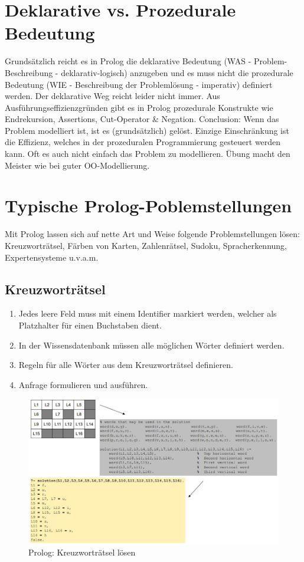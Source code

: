 \section{Deklarative vs. Prozedurale Bedeutung}
Grundsätzlich reicht es in Prolog die deklarative Bedeutung (WAS - Problem-Beschreibung - deklarativ-logisch) anzugeben und es muss nicht die prozedurale Bedeutung (WIE - Beschreibung der Problemlösung - imperativ) definiert werden. Der deklarative Weg reicht leider nicht immer. Aus Ausführungseffizienzgründen gibt es in Prolog prozedurale Konstrukte wie Endrekursion, Assertions, Cut-Operator \& Negation. Conclusion: Wenn das Problem modelliert ist, ist es (grundsätzlich) gelöst. Einzige Einschränkung ist die Effizienz, welches in der prozeduralen Programmierung gesteuert werden kann. Oft es auch nicht einfach das Problem zu modellieren. Übung macht den Meister wie bei guter OO-Modellierung.

\section{Typische Prolog-Poblemstellungen}
Mit Prolog lassen sich auf nette Art und Weise folgende Problemstellungen lösen: Kreuzworträtsel, Färben von Karten, Zahlenrätsel, Sudoku, Spracherkennung, Expertensysteme u.v.a.m.

\subsection{Kreuzworträtsel}
\begin{enumerate}
	\item Jedes leere Feld muss mit einem Identifier markiert werden, welcher als Platzhalter für einen Buchstaben dient.
	\item  In der Wissensdatenbank müssen alle möglichen Wörter definiert werden.
	\item Regeln für alle Wörter aus dem Kreuzworträtsel definieren.
	\item Anfrage formulieren und ausführen.
\end{enumerate}

\begin{figure}[h!]
\centering
\includegraphics[width=1\linewidth]{fig/prolog-kreuzwortraetsel}
\caption{Prolog: Kreuzworträtsel lösen}
\label{fig:prolog-kreuzwortraetsel}
\end{figure}

